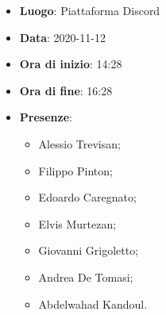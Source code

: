 \begin{itemize}
    \item \textbf{Luogo}: Piattaforma Discord
    \item \textbf{Data}: 2020-11-12
    \item \textbf{Ora di inizio}: 14:28
    \item \textbf{Ora di fine}: 16:28
    \item \textbf{Presenze}:
          \begin{itemize}
              \item Alessio Trevisan;
              \item Filippo Pinton;
              \item Edoardo Caregnato;
              \item Elvis Murtezan;
              \item Giovanni Grigoletto;
              \item Andrea De Tomasi;
              \item Abdelwahad Kandoul.
          \end{itemize}
\end{itemize}